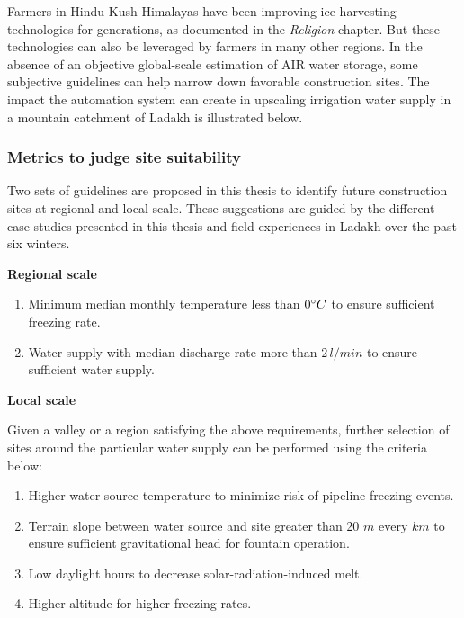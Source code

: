 Farmers in Hindu Kush Himalayas have been improving ice harvesting technologies for generations, as documented in
the \textit{Religion} chapter. But these technologies can also be leveraged by farmers in many other regions. In
the absence of an objective global-scale estimation of AIR water storage, some subjective guidelines
can help narrow down favorable construction sites. The impact the automation system
can create in upscaling irrigation water supply in a mountain catchment of Ladakh is illustrated below.

\subsubsection{Metrics to judge site suitability}

Two sets of guidelines are proposed in this thesis to identify future construction sites at regional and local scale. These
suggestions are guided by the different case studies presented in this thesis and field experiences in
Ladakh over the past six winters.

\textbf{Regional scale}

\begin{enumerate}

	\item Minimum median monthly temperature less than $0 ^{\circ} C$ to ensure sufficient freezing rate.
	\item Water supply with median discharge rate more than $2\, l/min$ to ensure sufficient water supply.

\end{enumerate}

\textbf{Local scale}

Given a valley or a region satisfying the above requirements, further selection of sites around the particular
water supply can be performed using the criteria below:

\begin{enumerate}
	\item Higher water source temperature to minimize risk of pipeline freezing events.
	\item Terrain slope between water source and site greater than 20 $m$ every $km$ to ensure sufficient
    gravitational head for fountain operation.
	\item Low daylight hours to decrease solar-radiation-induced melt.
	\item Higher altitude for higher freezing rates.
\end{enumerate}

